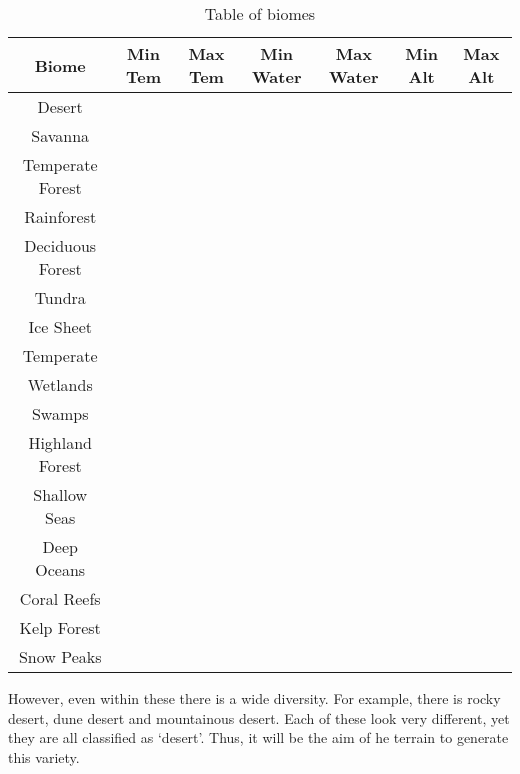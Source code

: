 \documentclass[11pt]{article}
\begin{document}
    \begin{table}
        \centering
        \caption{Table of biomes}
        \label{tab:biomes}
        \begin{tabular}{c | c c c c c c}
            Biome & Min Tem & Max Tem & Min Water & Max Water & Min Alt & Max Alt\\
            \hline
            Desert & &  &  &  &  & \\
            Savanna & &  &  &  &  & \\
            Temperate Forest & &  &  &  &  & \\
            Rainforest & &  &  &  &  & \\
            Deciduous Forest & &  &  &  &  & \\
            Tundra & &  &  &  &  & \\
            Ice Sheet & &  &  &  &  & \\
            Temperate & &  &  &  &  & \\
            Wetlands & &  &  &  &  & \\
            Swamps & &  &  &  &  & \\
            Highland Forest & &  &  &  &  & \\
            Shallow Seas & &  &  &  &  & \\
            Deep Oceans & &  &  &  &  & \\
            Coral Reefs & &  &  &  &  & \\
            Kelp Forest & &  &  &  &  & \\
            Snow Peaks & &  &  &  &  &
        \end{tabular}
    \end{table}
    However, even within these there is a wide diversity.
    For example, there is rocky desert, dune desert and mountainous desert.
    Each of these look very different, yet they are all classified as `desert'.
    Thus, it will be the aim of he terrain to generate this variety.
\end{document}
